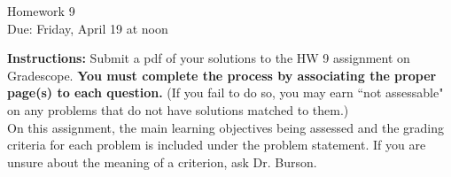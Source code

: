 \documentclass[12pt]{article}
\begin{document}
\begin{center}
{\Large Homework 9}\\
Due: Friday,  April 19 at noon\\


\end{center}
{\bf Instructions:} Submit a pdf of your solutions to the HW 9 assignment on Gradescope.  {\bf You must complete the process by associating the proper page(s) to each question.} (If you fail to do so, you may earn ``not assessable" on any problems that do not have solutions matched to them.)\\[3pt]

On this assignment, the main learning objectives being assessed and the grading criteria for each problem is included under the problem statement.  If you are unsure about the meaning of a criterion, ask Dr. Burson.  
\end{document}

